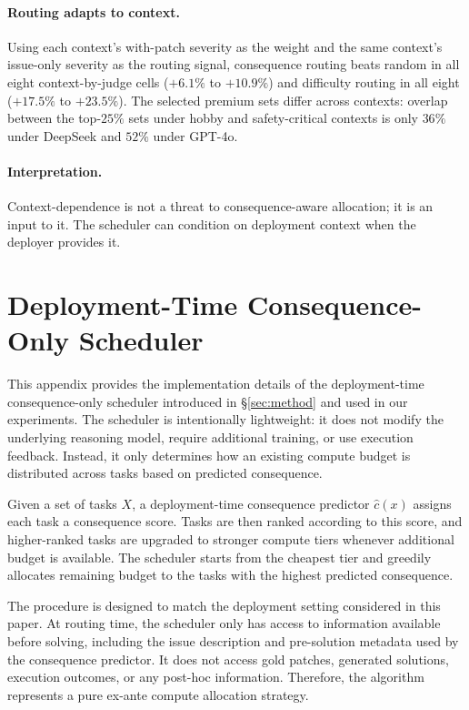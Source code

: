 \documentclass{article}
\begin{document}
\paragraph{Routing adapts to context.}
Using each context's with-patch severity as the weight and the same
context's issue-only severity as the routing signal, consequence
routing beats random in all eight context-by-judge cells
($+6.1\%$ to $+10.9\%$) and difficulty routing in all eight
($+17.5\%$ to $+23.5\%$). The selected premium sets differ across
contexts: overlap between the top-$25\%$ sets under hobby and
safety-critical contexts is only $36\%$ under DeepSeek and $52\%$
under GPT-4o.

\paragraph{Interpretation.}
Context-dependence is not a threat to consequence-aware allocation; it
is an input to it. The scheduler can condition on deployment context
when the deployer provides it.


\section{Deployment-Time Consequence-Only Scheduler}
\label{app:scheduler}

This appendix provides the implementation details of the
deployment-time consequence-only scheduler introduced in
\S\ref{sec:method} and used in our experiments.
The scheduler is intentionally lightweight: it does not modify the
underlying reasoning model, require additional training, or use
execution feedback. Instead, it only determines how an existing
compute budget is distributed across tasks based on predicted
consequence.

Given a set of tasks $X$, a deployment-time consequence predictor
$\hat{c}(x)$ assigns each task a consequence score. Tasks are then
ranked according to this score, and higher-ranked tasks are upgraded
to stronger compute tiers whenever additional budget is available.
The scheduler starts from the cheapest tier and greedily allocates
remaining budget to the tasks with the highest predicted consequence.

The procedure is designed to match the deployment setting considered
in this paper. At routing time, the scheduler only has access to
information available before solving, including the issue description
and pre-solution metadata used by the consequence predictor. It does
not access gold patches, generated solutions, execution outcomes, or
any post-hoc information. Therefore, the algorithm represents a pure
ex-ante compute allocation strategy.
\end{document}
